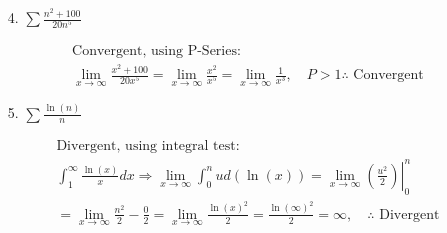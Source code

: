 \begin{itemize}
        \item [4.]
        $\sum\frac{n^{2}+100}{20n^{5}}$
        \\
        \begin{mdframed}
            \begin{equation*}
                \begin{gathered}
                    \boxed{\text{Convergent, using P-Series:}}                                \\
                      \lim_{x \to \infty}\frac{x^{2}+100}{20x^{5}}
                    = \lim_{x \to \infty}\frac{x^{2}}{x^{5}}
                    = \lim_{x \to \infty}\frac{1}{x^{3}}, \quad
                    P > 1 \therefore \text{ Convergent}
                \end{gathered}
            \end{equation*}
        \end{mdframed}
        
        \item [5.]
        $\sum\frac{\ln(n)}{n}$
        \\
        \begin{mdframed}
            \begin{equation*}
                \begin{gathered}
                    \boxed{\text{Divergent, using integral test:}}                               \\
                      \int_{1}^{\infty}\frac{\ln(x)}{x}dx \Rightarrow 
                        \lim_{x \to \infty}\int_{0}^{n}ud(\ln(x))
                      = \lim_{x \to \infty}\left.\left(\frac{u^{2}}{2}\right)\right|_{0}^{n}\\
                      = \lim_{x \to \infty}\frac{n^{2}}{2}-\frac{0}{2}
                      = \lim_{x \to \infty}\frac{\ln(x)^{2}}{2}
                      = \frac{\ln(\infty)^{2}}{2} = \infty, \quad
                      \therefore \text{ Divergent}
                \end{gathered}
            \end{equation*}
        \end{mdframed}
    \end{itemize}
